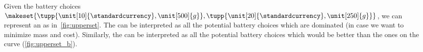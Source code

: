 Given the battery choices~$\makeset{\tupp{\unit[10]{\standardcurrency},\unit[500]{g}}, \tupp{\unit[20]{\standardcurrency},\unit[250]{g}}}$, we can represent an  as in~\cref{fig:upperset}.
The  can be interpreted as all the potential battery choices which are dominated (in case we want to minimize mass and cost).
Similarly, the  can be interpreted as all the potential battery choices which would be better than the ones on the curve (\cref{fig:upperset_b}).

\begin{figure}
    \caption{}
\end{figure}
%

